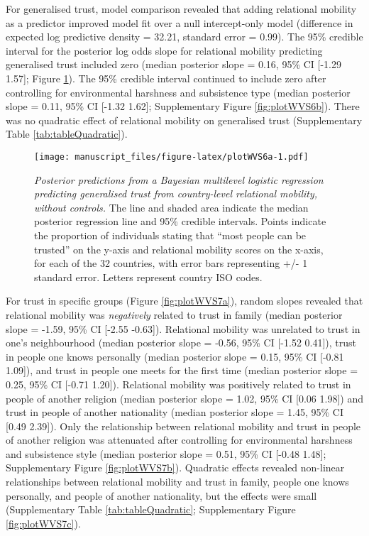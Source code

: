 \documentclass[
  man,floatsintext]{apa6}
\begin{document}
For generalised trust, model comparison revealed that adding relational mobility as a predictor improved model fit over a null intercept-only model (difference in expected log predictive density = 32.21, standard error = 0.99). The 95\% credible interval for the posterior log odds slope for relational mobility predicting generalised trust included zero (median posterior slope = 0.16, 95\% CI {[}-1.29 1.57{]}; Figure \ref{fig:plotWVS6a}). The 95\% credible interval continued to include zero after controlling for environmental harshness and subsistence type (median posterior slope = 0.11, 95\% CI {[}-1.32 1.62{]}; Supplementary Figure \ref{fig:plotWVS6b}). There was no quadratic effect of relational mobility on generalised trust (Supplementary Table \ref{tab:tableQuadratic}).



\begin{figure}
\centering
\texttt{[image: manuscript\_files/figure-latex/plotWVS6a-1.pdf]}
\caption{\label{fig:plotWVS6a}\emph{Posterior predictions from a Bayesian multilevel logistic regression predicting generalised trust from country-level relational mobility, without controls.} The line and shaded area indicate the median posterior regression line and 95\% credible intervals. Points indicate the proportion of individuals stating that ``most people can be trusted'' on the y-axis and relational mobility scores on the x-axis, for each of the 32 countries, with error bars representing +/- 1 standard error. Letters represent country ISO codes.}
\end{figure}

For trust in specific groups (Figure \ref{fig:plotWVS7a}), random slopes revealed that relational mobility was \emph{negatively} related to trust in family (median posterior slope = -1.59, 95\% CI {[}-2.55 -0.63{]}). Relational mobility was unrelated to trust in one's neighbourhood (median posterior slope = -0.56, 95\% CI {[}-1.52 0.41{]}), trust in people one knows personally (median posterior slope = 0.15, 95\% CI {[}-0.81 1.09{]}), and trust in people one meets for the first time (median posterior slope = 0.25, 95\% CI {[}-0.71 1.20{]}). Relational mobility was positively related to trust in people of another religion (median posterior slope = 1.02, 95\% CI {[}0.06 1.98{]}) and trust in people of another nationality (median posterior slope = 1.45, 95\% CI {[}0.49 2.39{]}). Only the relationship between relational mobility and trust in people of another religion was attenuated after controlling for environmental harshness and subsistence style (median posterior slope = 0.51, 95\% CI {[}-0.48 1.48{]}; Supplementary Figure \ref{fig:plotWVS7b}). Quadratic effects revealed non-linear relationships between relational mobility and trust in family, people one knows personally, and people of another nationality, but the effects were small (Supplementary Table \ref{tab:tableQuadratic}; Supplementary Figure \ref{fig:plotWVS7c}).
\end{document}
